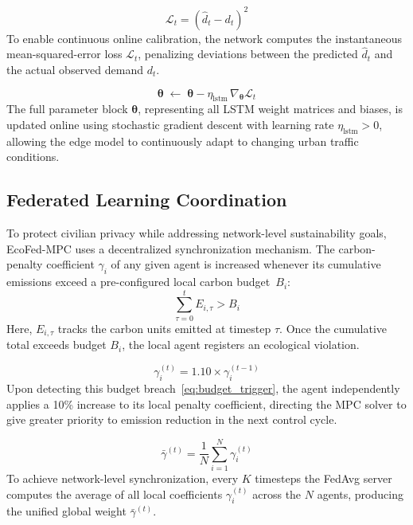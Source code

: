 \documentclass[journal]{IEEEtran}
\begin{document}
\begin{equation}
    \mathcal{L}_t = \left(\hat{d}_t - d_t\right)^{2}
    \label{eq:lstm_loss}
\end{equation}
To enable continuous online calibration, the network computes the instantaneous mean-squared-error loss $\mathcal{L}_t$, penalizing deviations between the predicted $\hat{d}_t$ and the actual observed demand $d_t$.

\begin{equation}
    \boldsymbol{\theta} \;\leftarrow\;
    \boldsymbol{\theta} - \eta_{\text{lstm}}\,\nabla_{\!\boldsymbol{\theta}}\mathcal{L}_t
    \label{eq:lstm_sgd}
\end{equation}
The full parameter block $\boldsymbol{\theta}$, representing all LSTM weight matrices and biases, is updated online using stochastic gradient descent with learning rate $\eta_{\text{lstm}} > 0$, allowing the edge model to continuously adapt to changing urban traffic conditions.

\subsection{Federated Learning Coordination}
To protect civilian privacy while addressing network-level sustainability goals, EcoFed-MPC uses a decentralized synchronization mechanism. The carbon-penalty coefficient $\gamma_i$ of any given agent is increased whenever its cumulative emissions exceed a pre-configured local carbon budget~$B_i$:
\begin{equation}
    \sum_{\tau=0}^{t} E_{i,\tau} > B_i
    \label{eq:budget_trigger}
\end{equation}
Here, $E_{i,\tau}$ tracks the carbon units emitted at timestep $\tau$. Once the cumulative total exceeds budget $B_i$, the local agent registers an ecological violation.

\begin{equation}
    \gamma_i^{(t)} = 1.10 \times \gamma_i^{(t-1)}
    \label{eq:gamma_update}
\end{equation}
Upon detecting this budget breach~\eqref{eq:budget_trigger}, the agent independently applies a 10\% increase to its local penalty coefficient, directing the MPC solver to give greater priority to emission reduction in the next control cycle.

\begin{equation}
    \bar{\gamma}^{(t)} = \frac{1}{N} \sum_{i=1}^{N} \gamma_i^{(t)}
    \label{eq:fedavg}
\end{equation}
To achieve network-level synchronization, every $K$ timesteps the FedAvg server computes the average of all local coefficients $\gamma_i^{(t)}$ across the $N$ agents, producing the unified global weight $\bar{\gamma}^{(t)}$.
\end{document}
